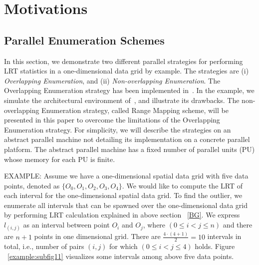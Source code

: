 \documentclass[AMA,LATO1COL]{WileyNJD-v2}
\begin{document}
\section{Motivations}
\label{sec:mov}

\subsection{Parallel Enumeration Schemes}
\label{sec:mov1}

In this section, we demonstrate two different parallel strategies for performing LRT statistics in a one-dimensional data grid by example. The strategies are (i) \emph{Overlapping Enumeration}, and (ii) \emph{Non-overlapping Enumeration}. The Overlapping Enumeration strategy has been implemented in~\cite{apweb}. In the example, we simulate the architectural environment of~\cite{apweb}, and illustrate its drawbacks. The non-overlapping Enumeration strategy, called Range Mapping scheme, will be presented in this paper to overcome the limitations of the Overlapping Enumeration strategy. For simplicity, we will describe the strategies on an abstract parallel machine not detailing its implementation on a concrete parallel platform.  The abstract parallel machine has a fixed number of parallel units (PU) whose memory for each PU is finite.

EXAMPLE: Assume we have a one-dimensional spatial data grid with  five data points, denoted as $\{O_0,O_1,O_2,O_3,O_4\}$. We would like to compute the LRT of each interval for the one-dimensional spatial data grid. To find the outlier, we enumerate all intervals that can be spawned over the one-dimensional data grid by performing LRT calculation explained in above section ~\ref{BG}. We express $l_{(i,j)}$ as an interval between point $O_i$ and $O_j$, where $ (0 \leq i <j \leq n)$ and there are $n+1$ points in one dimensional grid.  There are ${\frac{4 \cdot (4+1)}{2}}=10$ intervals in total, i.e., number of pairs $(i,j)$ for which $(0 \leq i < j \leq 4)$ holds. Figure ~\ref{example:subfig11} visualizes some intervals among above five data points.
\end{document}
